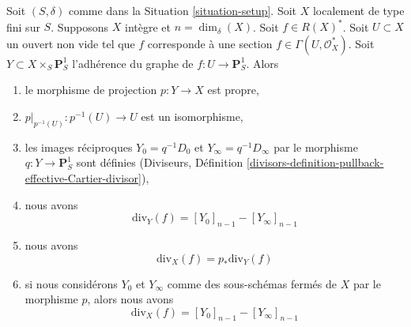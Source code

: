 \begin{lemma}
\label{lemma-rational-function}
Soit $(S, \delta)$ comme dans la Situation \ref{situation-setup}.
Soit $X$ localement de type fini sur $S$. Supposons $X$
intègre et $n = \dim_\delta(X)$. Soit $f \in R(X)^*$.
Soit $U \subset X$ un ouvert non vide tel que $f$
corresponde à une section $f \in \Gamma(U, \mathcal{O}_X^*)$.
Soit $Y \subset X \times_S \mathbf{P}^1_S$ l'adhérence du
graphe de $f : U \to \mathbf{P}^1_S$.
Alors
\begin{enumerate}
\item le morphisme de projection $p : Y \to X$ est propre,
\item $p|_{p^{-1}(U)} : p^{-1}(U) \to U$ est un isomorphisme,
\item les images réciproques $Y_0 = q^{-1}D_0$ et $Y_\infty = q^{-1}D_\infty$
par le morphisme $q : Y \to \mathbf{P}^1_S$ sont définies
(Diviseurs, Définition
\ref{divisors-definition-pullback-effective-Cartier-divisor}),
\item nous avons
$$
\text{div}_Y(f) = [Y_0]_{n - 1} - [Y_\infty]_{n - 1}
$$
\item nous avons
$$
\text{div}_X(f) = p_*\text{div}_Y(f)
$$
\item si nous considérons $Y_0$ et $Y_\infty$ comme des sous-schémas fermés de $X$
par le morphisme $p$, alors nous avons
$$
\text{div}_X(f) = [Y_0]_{n - 1} - [Y_\infty]_{n - 1}
$$
\end{enumerate}
\end{lemma}

